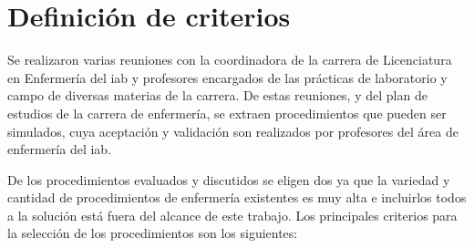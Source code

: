 \section{Definición de criterios}
\label{sec:criterios}

Se realizaron varias reuniones con la coordinadora de la carrera de Licenciatura
en Enfermería del \Gls{iab} y profesores encargados de las prácticas de
laboratorio y campo de diversas materias de la carrera. De estas reuniones, y
del plan de estudios de la carrera de enfermería, se extraen procedimientos que
pueden ser simulados, cuya aceptación y validación son realizados por  
profesores del área de enfermería del \Gls{iab}.

De los procedimientos evaluados y discutidos se eligen dos ya que la variedad y
cantidad de procedimientos de enfermería existentes es muy alta e incluirlos
todos a la solución está fuera del alcance de este trabajo. Los principales
criterios para la selección de los procedimientos son los siguientes:

